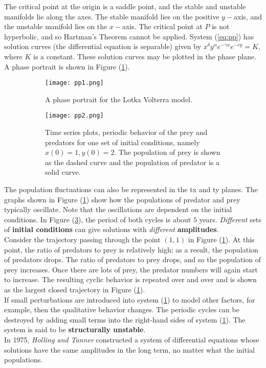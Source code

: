 The critical point at the origin is a saddle point, and the stable and unstable manifolds lie along the axes.
The stable manifold lies on the positive $y-$axis, and the unstable manifold lies on the $x-$axis.
The critical point at $P$ is not hyperbolic, and so Hartman’s Theorem cannot be applied. System (\ref{eq:pp}) has solution curves (the differential equation is separable) given by $x^\delta y^\alpha e^{-\gamma x}e^{-cy}=K$, where $K$ is a constant.
These solution curves may be plotted in the phase plane. A phase portrait is shown in Figure (\ref{fig:pp}).
\begin{figure}[H]
	\centering
	\begin{subfigure}{0.45\linewidth}
		\raggedleft
		\texttt{[image: pp1.png]}
		\caption{A phase portrait for the Lotka Volterra model.}
		\label{fig:pp}
	\end{subfigure}
	\vline
	\begin{subfigure}{0.45\linewidth}
		\raggedright
		\texttt{[image: pp2.png]}
		\caption{Time series plots, periodic behavior of the prey and predators for one set of initial conditions, namely $x(0)=1, y(0)=2$. The population of prey is shown as the dashed curve and the population of predator is a solid curve.}
		\label{fig:pp2}
	\end{subfigure}
	\caption{}
\end{figure}
The population fluctuations can also be represented in the tx and ty planes.
The graphs shown in Figure (\ref{fig:pp}) show how the populations of predator and prey typically oscillate.
Note that the oscillations are dependent on the initial conditions. In Figure (\ref{fig:pp2}), the period of both cycles is about $5$ years.
\emph{Different} sets of {\textbf{initial conditions}} can give solutions with \emph{different} {\textbf{amplitudes}}.\\
Consider the trajectory passing through the point $(1, 1)$ in Figure (\ref{fig:pp}).
At this point, the ratio of predators to prey is relatively high; as a result, the population of predators drops.
The ratio of predators to prey drops, and so the population of prey increases.
Once there are lots of prey, the predator numbers will again start to increase. The resulting cyclic behavior is repeated over and over and is shown as the largest closed trajectory in Figure (\ref{fig:pp}).\\
If small perturbations are introduced into system (\ref{fig:pp}) to model other factors, for example, then the qualitative behavior changes.
The periodic cycles can be destroyed by adding small terms into the right-hand sides of system (\ref{fig:pp}).
The system is said to be {\textbf{structurally unstable}}.\\	
In 1975, \emph{Holling and Tanner} constructed a system of differential equations whose solutions have the same amplitudes in the long term, no matter what the initial populations.